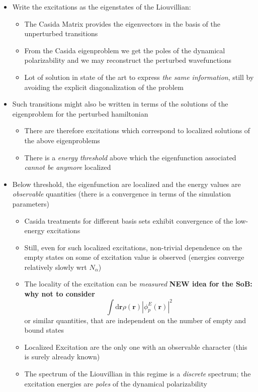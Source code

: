 \documentclass[a4paper]{article}
\begin{document}
\begin{itemize}
\item Write the excitations as the eigenstates of the Liouvillian:
\begin{itemize}
\item The Casida Matrix provides the eigenvectors in the basis of the unperturbed transitions
\item From the Casida eigenproblem we 
get the poles of the dynamical polarizability and we may reconstruct the perturbed wavefunctions
\item Lot of solution in state of 
the art to express \emph{the same information}, still by avoiding the explicit diagonalization of the problem
\end{itemize}
\item Such transitions might also be written in terms of the solutions of the eigenproblem for the perturbed hamiltonian
\begin{itemize}
\item There are therefore excitations which correspond to localized solutions of the above eigenproblems
\item There is a \emph{energy threshold} above which the eigenfunction associated \emph{cannot be anymore} localized
\end{itemize}
\item Below threshold, the eigenfunction are localized and the energy values are \emph{observable} quantities (there is a convergence in terms of the simulation parameters)
\begin{itemize}
\item Casida treatments for different
basis sets exhibit convergence of the low-energy excitations
\item Still, even for such localized excitations, non-trivial dependence on the empty states on some of excitation value is observed (energies converge relatively slowly wrt $N_\alpha$)
\item The locality of the excitation can be \emph{measured}
{\bf NEW idea for the SoB: why not to consider}
$$
\int \mathrm d \mathbf r
\rho(\mathbf r) |\phi_p^E(\mathbf r)|^2
$$
or similar quantities, that are independent on the number of empty and  bound states
\item Localized Excitation are the  only one with an observable character (this is surely already known)
\item The spectrum of the Liouvillian in this regime is a \emph{discrete} spectrum; the excitation energies are \emph{poles} of the dynamical polarizability

\end{itemize}
\end{itemize}
\end{document}
